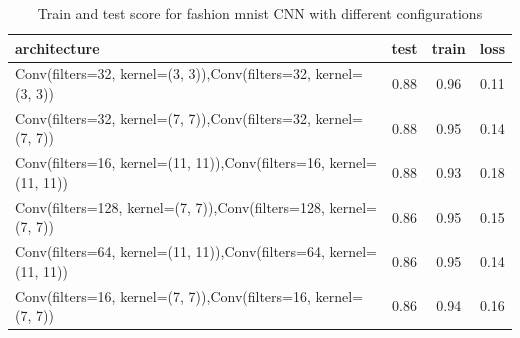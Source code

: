 \documentclass[10pt]{SelfArx} %
\begin{document}
	\begin{table}[]
		\begin{tabular*}{1\linewidth}{@{\extracolsep{\fill} }lccc@{}}
			\toprule
			architecture & test & train & loss \\ \midrule
			Conv(filters=32, kernel=(3, 3)),Conv(filters=32, kernel=(3, 3)) & 0.88 & 0.96 & 0.11 \\
			Conv(filters=32, kernel=(7, 7)),Conv(filters=32, kernel=(7, 7)) & 0.88 & 0.95 & 0.14 \\
			Conv(filters=16, kernel=(11, 11)),Conv(filters=16, kernel=(11, 11)) & 0.88 & 0.93 & 0.18 \\
			Conv(filters=128, kernel=(7, 7)),Conv(filters=128, kernel=(7, 7)) & 0.86 & 0.95 & 0.15 \\
			Conv(filters=64, kernel=(11, 11)),Conv(filters=64, kernel=(11, 11)) & 0.86 & 0.95 & 0.14 \\
			Conv(filters=16, kernel=(7, 7)),Conv(filters=16, kernel=(7, 7)) & 0.86 & 0.94 & 0.16 \\ \bottomrule
		\end{tabular*}
		\caption{Train and test score for fashion mnist CNN  with different configurations}
		\label{tfashion2}
	\end{table}
	
\end{document}
